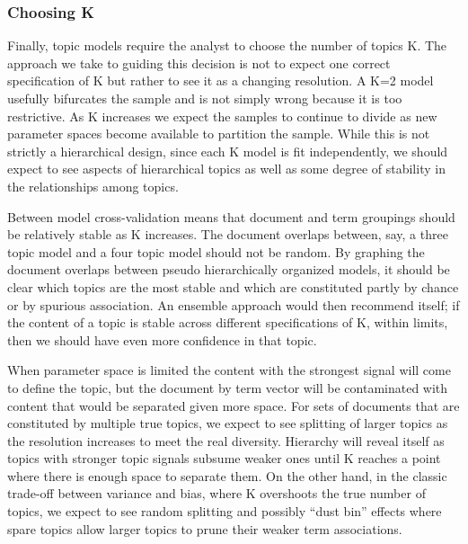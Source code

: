 \documentclass[]{book}
\theoremstyle{definition}
\theoremstyle{definition}
\theoremstyle{definition}
\theoremstyle{remark}
\begin{document}
\hypertarget{choosing-k}{%
\subsubsection{Choosing K}\label{choosing-k}}

Finally, topic models require the analyst to choose the number of topics
K. The approach we take to guiding this decision is not to expect one
correct specification of K but rather to see it as a changing
resolution. A K=2 model usefully bifurcates the sample and is not simply
wrong because it is too restrictive. As K increases we expect the
samples to continue to divide as new parameter spaces become available
to partition the sample. While this is not strictly a hierarchical
design, since each K model is fit independently, we should expect to see
aspects of hierarchical topics as well as some degree of stability in
the relationships among topics.

Between model cross-validation means that document and term groupings
should be relatively stable as K increases. The document overlaps
between, say, a three topic model and a four topic model should not be
random. By graphing the document overlaps between pseudo hierarchically
organized models, it should be clear which topics are the most stable
and which are constituted partly by chance or by spurious association.
An ensemble approach would then recommend itself; if the content of a
topic is stable across different specifications of K, within limits,
then we should have even more confidence in that topic.

When parameter space is limited the content with the strongest signal
will come to define the topic, but the document by term vector will be
contaminated with content that would be separated given more space. For
sets of documents that are constituted by multiple true topics, we
expect to see splitting of larger topics as the resolution increases to
meet the real diversity. Hierarchy will reveal itself as topics with
stronger topic signals subsume weaker ones until K reaches a point where
there is enough space to separate them. On the other hand, in the
classic trade-off between variance and bias, where K overshoots the true
number of topics, we expect to see random splitting and possibly ``dust
bin'' effects where spare topics allow larger topics to prune their
weaker term associations.
\end{document}
